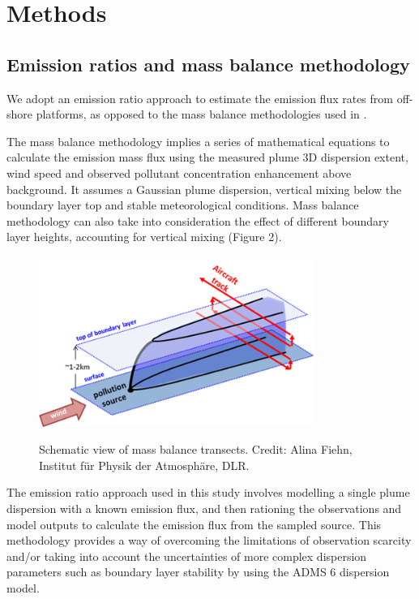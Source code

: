 \documentclass[12pt]{article}
\begin{document}
\newpage\section{Methods}\label{methods}

\subsection{Emission ratios and mass balance methodology}

We adopt an emission ratio  approach to estimate the emission flux rates from off-shore platforms, as opposed to the mass balance methodologies used in \cite{Lee2018FlowRelease}.

The mass balance methodology implies a series of mathematical equations to calculate the emission mass flux using the measured plume 3D dispersion  extent, wind speed and observed pollutant concentration enhancement above background.  It assumes a Gaussian plume dispersion, vertical mixing below the boundary layer top and stable meteorological conditions. Mass balance methodology can also take into consideration the effect of different boundary layer heights, accounting for vertical mixing (Figure 2). 
\begin{figure}[H]
\centering
\includegraphics[width=0.8\textwidth]{Plots/Mass balance.png}
\caption{\label{fig:mass balance}} Schematic view of mass balance transects. Credit: Alina Fiehn, Institut für Physik der Atmosphäre, DLR. 
\end{figure}

The emission ratio approach used in this study involves modelling a single plume dispersion with a known emission flux, and then rationing the observations and model outputs to calculate the emission flux from the sampled source. This methodology provides a way of overcoming the limitations of observation scarcity and/or taking into account the uncertainties of more complex dispersion parameters such as boundary layer stability \parencite[]{Shah2020TestingSampling} by using the ADMS 6 dispersion model.
\end{document}

